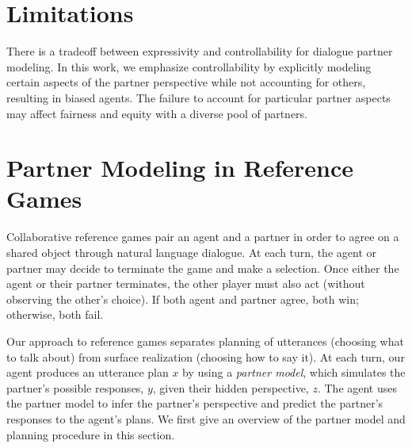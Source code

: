 \documentclass[11pt]{article}
\begin{document}
\section*{Limitations}
There is a tradeoff between expressivity and  controllability for dialogue partner modeling.
In this work, we emphasize controllability by explicitly modeling certain aspects of the partner perspective while not accounting for others, resulting in biased agents.
The failure to account for
particular partner aspects may affect fairness and equity with a diverse pool of partners.





\appendix



\section{Partner Modeling in Reference Games}
\label{sec:planning}

Collaborative reference games pair an agent and a partner in order to agree on a shared object through natural language dialogue.
At each turn, the agent or partner may decide to terminate the game and make a selection.
Once either the agent or their partner terminates, the other player must also act (without observing the other's choice). If both agent and partner agree, both win; otherwise, both fail. 

Our approach to reference games separates planning of utterances (choosing what to talk about) from surface realization (choosing how to say it).
At each turn, our agent produces an utterance plan $x$ by using a \emph{partner model}, which simulates the partner's possible responses, $y$, given their hidden perspective, $z$.
The agent uses the partner model to infer the partner's perspective and predict the partner's responses to the agent's plans.
We first give an overview of the partner model 
and planning procedure in this section.
\end{document}
